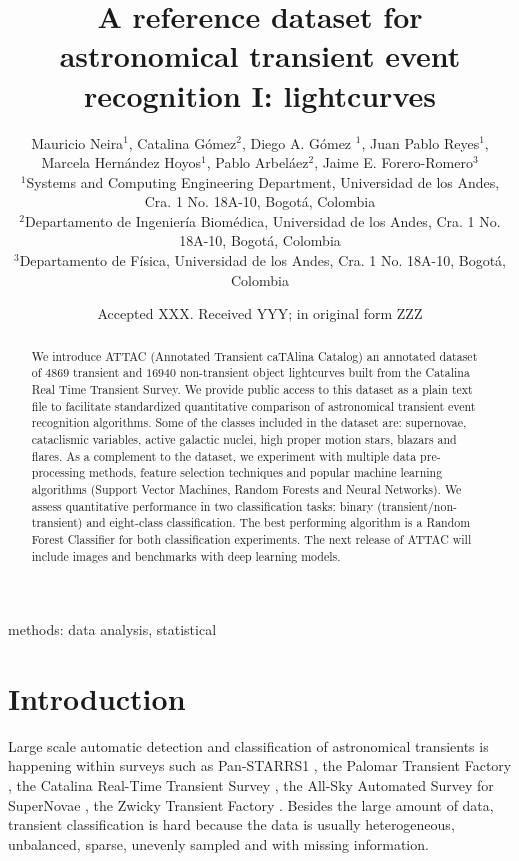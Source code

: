 \documentclass[usenatbib]{mnras}
\title[A reference transient dataset I: lightcurves]{A reference
  dataset for astronomical transient event recognition I: lightcurves}
\author[M. Neira et al.]
{Mauricio Neira$^{1}$, Catalina G\'omez$^{2}$, Diego A. G\'omez $^{1}$,
Juan Pablo Reyes$^{1}$,
\newauthor
Marcela Hern\'andez Hoyos$^{1}$,   
Pablo Arbel\'aez$^{2}$,
Jaime E. Forero-Romero$^{3}$
\\
$^{1}$Systems and Computing Engineering Department, Universidad de los Andes, Cra. 1 No. 18A-10, Bogot\'a, Colombia\\
$^{2}$Departamento de Ingenier\'ia Biom\'edica, Universidad de los Andes, Cra. 1 No. 18A-10, Bogot\'a, Colombia\\
$^{3}$Departamento de F\'isica, Universidad de los Andes, Cra. 1 No. 18A-10, Bogot\'a, Colombia
}
\date{Accepted XXX. Received YYY; in original form ZZZ}
\begin{document}
\label{firstpage}
\pagerange{\pageref{firstpage}--\pageref{lastpage}}
\maketitle

\begin{abstract}
We introduce ATTAC (Annotated Transient caTAlina Catalog) an
annotated dataset of $4869$ transient and $16940$ non-transient
object lightcurves built from the Catalina Real Time Transient
Survey.
We provide public access to this dataset as a plain text file to facilitate
standardized quantitative comparison of astronomical transient event
recognition algorithms. 
Some of the classes included in the dataset are: supernovae, cataclismic
variables, active galactic nuclei, high proper motion stars, blazars
and flares.
As a complement to the dataset, we experiment with multiple
data pre-processing methods, feature selection techniques and popular
machine learning algorithms (Support Vector Machines, Random Forests
and Neural Networks).   
We assess quantitative performance in two classification tasks:
binary (transient/non-transient) and eight-class classification.   
The best performing algorithm is a Random Forest Classifier for both
classification experiments.  
The next release of ATTAC will include images and benchmarks with
deep learning models. 
\end{abstract}

\begin{keywords}
methods: data analysis, statistical
\end{keywords}



\section{Introduction}



Large scale automatic detection and classification of astronomical
transients is happening within surveys such as Pan-STARRS1
\citep{2004SPIE.5489...11K}, the Palomar Transient Factory
\citep{2009PASP..121.1395L},  the Catalina Real-Time Transient Survey
\citep{2009ApJ...696..870D}, the All-Sky Automated Survey for
SuperNovae \citep{2014ApJ...788...48S}, the Zwicky Transient
Factory \citep{2019PASP..131a8002B}.
Besides the large amount of data, transient
classification is hard because the data is usually heterogeneous,
unbalanced, sparse, unevenly sampled and with missing information.   
\end{document}
